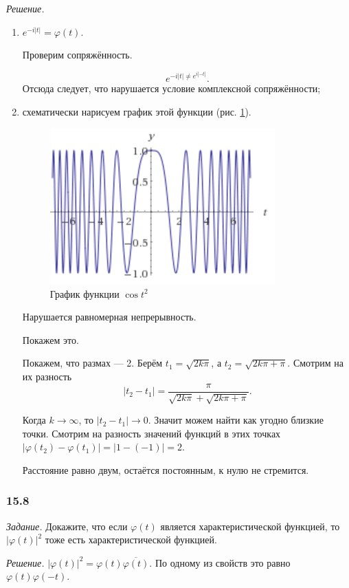 \textit{Решение.}
\begin{enumerate}[label=\alph*)]
\item $e^{- i \left| t \right| } = \varphi \left( t \right)$.

Проверим сопряжённость.

$$e^{- i \left| t \right| \neq e^{i \left| - t \right| }}.$$
Отсюда следует, что нарушается условие комплексной сопряжённости;
\item схематически нарисуем график этой функции (рис. \ref{fig:157}).

\begin{figure}[h!]
  \centering
  \includegraphics[width=.4\textwidth]{./pictures/15_7.png}
  \caption{График функции $ \cos t^2$}
  \label{fig:157}
\end{figure}

Нарушается равномерная непрерывность.

Покажем это.

Покажем, что размах --- 2.
Берём $t_1 = \sqrt{2k \pi }$, а $t_2 = \sqrt{2k \pi + \pi }$.
Смотрим на их разность
$$ \left| t_2 - t_1 \right| =
\frac{ \pi }{ \sqrt{2k \pi } + \sqrt{2k \pi + \pi }}.$$

Когда $k \rightarrow \infty $, то $ \left| t_2 - t_1 \right| \rightarrow 0$.
Значит можем найти как угодно близкие точки.
Смотрим на разность значений функций в этих точках
$ \left| \varphi \left( t_2 \right) - \varphi \left( t_1 \right) \right| =
  \left| 1 - \left( -1 \right) \right| =
  2$.

Расстояние равно двум, остаётся постоянным, к нулю не стремится.
\end{enumerate}

\subsubsection*{15.8}

\textit{Задание.}
Докажите, что если $ \varphi \left( t \right) $ является характеристической функцией,
то $ \left| \varphi \left( t \right) \right|^2$ тоже есть характеристической функцией.

\textit{Решение.}
$ \left| \varphi \left( t \right) \right|^2 =
  \varphi \left( t \right) \overline{ \varphi \left( t \right) }$.
По одному из свойств это равно $ \varphi \left( t \right) \varphi \left( - t \right) $.

